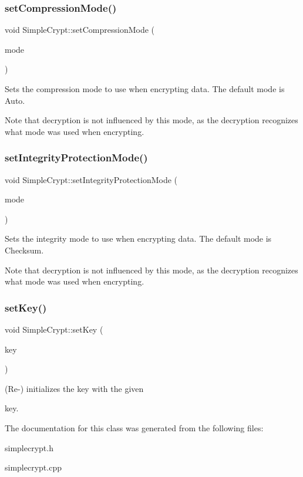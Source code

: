 \subsubsection{\texorpdfstring{set\+Compression\+Mode()}{setCompressionMode()}}
{\footnotesize\ttfamily void Simple\+Crypt\+::set\+Compression\+Mode (\begin{DoxyParamCaption}\item[{\hyperlink{classSimpleCrypt_a25298e746f175cf175a18f082092ca8e}{Compression\+Mode}}]{mode }\end{DoxyParamCaption})\hspace{0.3cm}{\ttfamily [inline]}}

Sets the compression mode to use when encrypting data. The default mode is Auto.

Note that decryption is not influenced by this mode, as the decryption recognizes what mode was used when encrypting. \mbox{\label{classSimpleCrypt_a4fef5e6d3246ee57d6a7b68475b12b8b}} 
\subsubsection{\texorpdfstring{set\+Integrity\+Protection\+Mode()}{setIntegrityProtectionMode()}}
{\footnotesize\ttfamily void Simple\+Crypt\+::set\+Integrity\+Protection\+Mode (\begin{DoxyParamCaption}\item[{\hyperlink{classSimpleCrypt_a42a5172e558d346b28421cc4e85feb2d}{Integrity\+Protection\+Mode}}]{mode }\end{DoxyParamCaption})\hspace{0.3cm}{\ttfamily [inline]}}

Sets the integrity mode to use when encrypting data. The default mode is Checksum.

Note that decryption is not influenced by this mode, as the decryption recognizes what mode was used when encrypting. \mbox{\label{classSimpleCrypt_aa7aad9ed2e88b883ba9214c7d9928745}} 
\subsubsection{\texorpdfstring{set\+Key()}{setKey()}}
{\footnotesize\ttfamily void Simple\+Crypt\+::set\+Key (\begin{DoxyParamCaption}\item[{quint64}]{key }\end{DoxyParamCaption})}

(Re-\/) initializes the key with the given \begin{DoxyItemize}
\item key. \end{DoxyItemize}


The documentation for this class was generated from the following files\+:\begin{DoxyCompactItemize}
\item 
simplecrypt.\+h\item 
simplecrypt.\+cpp\end{DoxyCompactItemize}
